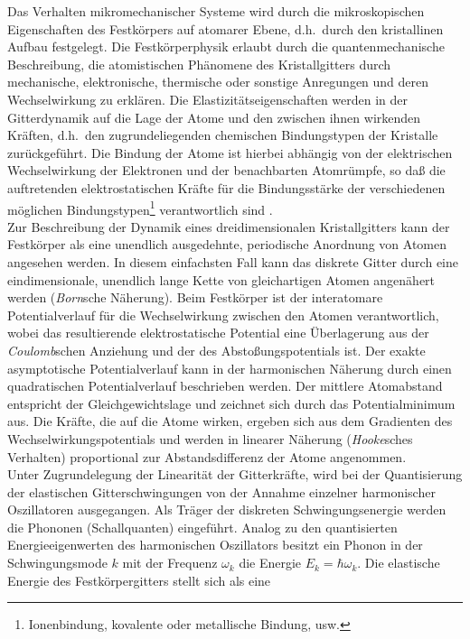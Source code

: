 Das Verhalten mikromechanischer Systeme wird durch die mikroskopischen
Eigenschaften des Festkörpers auf atomarer Ebene, d.h.\ durch den
kristallinen Aufbau festgelegt. Die Festkörperphysik erlaubt durch die
quantenmechanische Beschreibung, die atomistischen Phänomene des
Kristallgitters durch mechanische, elektronische, thermische oder
sonstige Anregungen und deren Wechselwirkung zu erklären. Die
Elastizitätseigenschaften werden in der Gitterdynamik auf die Lage der
Atome und den zwischen ihnen wirkenden Kräften, d.h.\ den
zugrundeliegenden chemischen Bindungstypen der Kristalle zurückgeführt.
Die Bindung der Atome ist hierbei abhängig von der elektrischen
Wechselwirkung der Elektronen und der benachbarten Atomrümpfe, so daß
die auftretenden elektrostatischen Kräfte für die Bindungsstärke
der verschiedenen möglichen Bindungstypen\footnote{Ionenbindung,
kovalente oder metallische Bindung, usw.} verantwortlich sind
\cite{Hel88}.\\
%
Zur Beschreibung der Dynamik eines dreidimensionalen Kristallgitters
kann der Festkörper als eine unendlich ausgedehnte, periodische
Anordnung von Atomen angesehen werden. In diesem einfachsten Fall kann
das diskrete Gitter durch eine eindimensionale, unendlich lange Kette
von gleichartigen Atomen angenähert werden ({\sl Born}\/sche Näherung).
Beim Festkörper ist der interatomare Potentialverlauf für die
Wechselwirkung zwischen den Atomen verantwortlich, wobei das
resultierende elektrostatische Potential eine Überlagerung aus der
{\sl Coulomb}\/schen Anziehung und der des Abstoßungspotentials ist.
Der exakte asymptotische Potentialverlauf kann in der harmonischen
Näherung durch einen quadratischen Potentialverlauf beschrieben werden.
Der mittlere Atomabstand entspricht der Gleichgewichtslage und
zeichnet sich durch das Potentialminimum aus.
Die Kräfte, die auf die Atome wirken, ergeben sich aus dem Gradienten
des Wechselwirkungspotentials und werden in linearer Näherung
({\sl Hooke}\/sches Verhalten) proportional zur Abstandsdifferenz der
Atome angenommen.\\
Unter Zugrundelegung der Linearität der Gitterkräfte, wird bei der
Quantisierung der elastischen Gitterschwingungen von der Annahme
einzelner harmonischer Oszillatoren ausgegangen. Als Träger der
diskreten Schwingungsenergie werden die Phononen (Schallquanten)
eingeführt. Analog zu den quantisierten Energieeigenwerten des
harmonischen Oszillators besitzt ein Phonon in der
Schwingungsmode $k$ mit der Frequenz $\omega_{k}$ die Energie
$E_{k} = \hbar \omega_{k}$.
Die elastische Energie des Festkörpergitters stellt sich als eine
